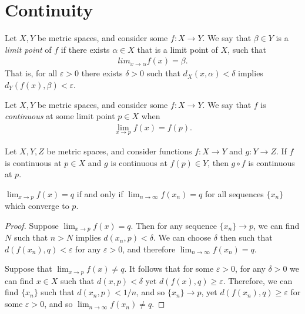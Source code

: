 \section{Continuity}

\begin{defn}
    Let $X, Y$ be metric spaces, and consider some $f: X \to Y$. We say that $\beta \in Y$ is a \emph{limit point} of $f$ if there exists $\alpha \in X$ that is a limit point of $X$, such that
    \begin{align*}
        lim_{x\to\alpha} f(x) = \beta.
    \end{align*}
    That is, for all $\varepsilon > 0$ there exists $\delta > 0$ such that $d_X(x, \alpha) < \delta$ implies $d_Y(f(x), \beta) < \varepsilon$.
\end{defn}

\begin{defn}
    Let $X, Y$ be metric spaces, and consider some $f: X \to Y$. We say that $f$ is \emph{continuous} at some limit point $p \in X$ when
    \begin{align*}
        \lim_{x\to p}f(x) = f(p).
    \end{align*}
\end{defn}

\begin{prop}
    Let $X, Y, Z$ be metric spaces, and consider functions $f: X \to Y$ and $g: Y \to Z$. If $f$ is continuous at $p \in X$ and $g$ is continuous at $f(p) \in Y$, then $g \circ f$ is continuous at $p$.
\end{prop}

\begin{thm}\label{thm:all-sequences-limit}
    $\lim_{x\to p}f(x) = q$ if and only if $\lim_{n\to \infty}f(x_n) = q$ for all sequences $\{x_n\}$ which converge to $p$.
\end{thm}

\begin{proof}
    Suppose $\lim_{x\to p}f(x) = q$. Then for any sequence $\{x_n\} \to p$, we can find $N$ such that $n > N$ implies $d(x_n, p) < \delta$. We can choose $\delta$ then such that $d\left(f(x_n), q\right) < \varepsilon$ for any $\varepsilon > 0$, and therefore $\lim_{n\to \infty}f(x_n) = q$.

    Suppose that $\lim_{x\to p}f(x) \neq q$. It follows that for some $\varepsilon > 0$, for any $\delta > 0$ we can find $x \in X$ such that $d(x, p) < \delta$ yet $d(f(x), q) \geq \varepsilon$. Therefore, we can find $\{x_n\}$ such that $d(x_n, p) < 1/n$, and so $\{x_n\} \to p$, yet $d(f(x_n), q) \geq \varepsilon$ for some $\varepsilon > 0$, and so $\lim_{n\to \infty}f(x_n) \neq q$.
\end{proof}


